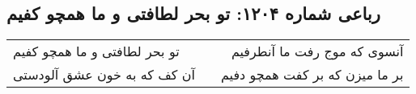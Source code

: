 \begin{center}
\section*{رباعی شماره ۱۲۰۴: تو بحر لطافتی و ما همچو کفیم}
\label{sec:1204}
\begin{longtable}{l p{0.5cm} r}
تو بحر لطافتی و ما همچو کفیم
&&
آنسوی که موج رفت ما آنطرفیم
\\
آن کف که به خون عشق آلودستی
&&
بر ما میزن که بر کفت همچو دفیم
\\
\end{longtable}
\end{center}
